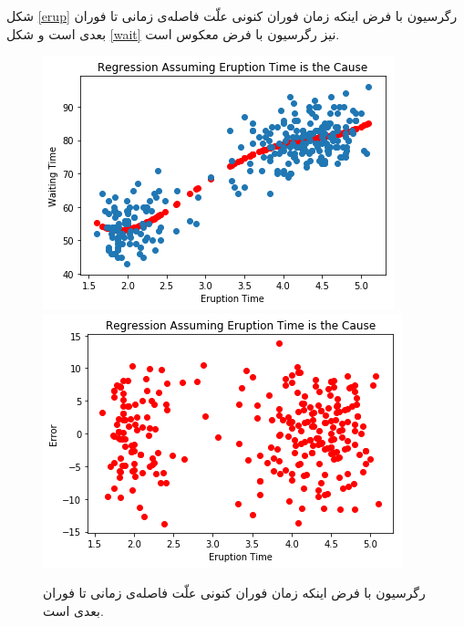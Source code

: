 \documentclass[papersize=a4]{report}
\begin{document}
شکل \eqref{erup} رگرسیون با فرض اینکه زمان فوران کنونی علّت فاصله‌ی زمانی تا فوران بعدی است و شکل \eqref{wait} نیز رگرسیون با فرض معکوس است.
\begin{figure}[h]
	\begin{floatrow}
	\centering
	\includegraphics[scale=0.451]{erup_time1.png}
	\includegraphics[scale=0.451]{erup_time2.png}
	\end{floatrow}
	\caption{رگرسیون با فرض اینکه زمان فوران کنونی علّت فاصله‌ی زمانی تا فوران بعدی است.}
	\label{erup}
\end{figure}
\end{document}
